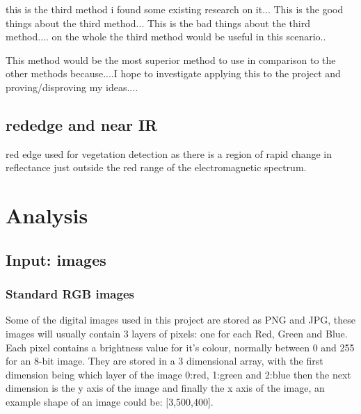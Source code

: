 this is the third method i found some existing research on it...
This is the good things about the third method...
This is the bad things about the third  method....
on the whole the third method would be useful in this scenario..

This method would be the most superior method to use in comparison to the other methods because....I hope to investigate applying this to the project and proving/disproving my ideas....

\subsection{rededge and near IR}

red edge used for vegetation detection as there is a region of rapid change in reflectance just outside the red range of the electromagnetic spectrum.


\section{Analysis}
\begin{comment}
Taking into account the problem and what you learned from the background work, what was your analysis of the problem? How did your analysis help to decompose the problem into the main tasks that you would undertake? Were there alternative approaches? Why did you choose one approach compared to the alternatives? 

There should be a clear statement of the research questions, which you will evaluate at the end of the work. 

In most cases, the agreed objectives or requirements will be the result of a compromise between what would ideally have been produced and what was felt to be possible in the time available. A discussion of the process of arriving at the final list is usually appropriate.
\end{comment}

\subsection{Input: images}

\subsubsection{Standard RGB images}

Some of the digital images used in this project are stored as PNG and JPG, these images will usually contain 3 layers of pixels: one for each Red, Green and Blue. Each pixel contains a brightness value for it's colour, normally between 0 and 255 for an 8-bit image. They are stored in a 3 dimensional array, with the first dimension being which layer of the image 0:red, 1:green and 2:blue then the next dimension is the y axis of the image and finally the x axis of the image, an example shape of an image could be: [3,500,400].

